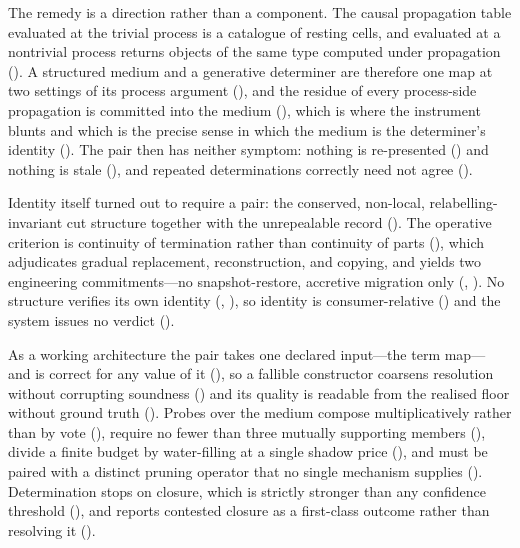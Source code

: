 \documentclass[11pt,twocolumn,a4paper]{article}
\theoremstyle{dirthm}
\theoremstyle{definition}
\theoremstyle{remark}
\begin{document}
The remedy is a direction rather than a component. The causal propagation table
evaluated at the trivial process is a catalogue of resting cells, and evaluated
at a nontrivial process returns objects of the same type computed under
propagation (). A structured medium and a generative
determiner are therefore one map at two settings of its process argument
(), and the residue of every process-side propagation is
committed into the medium (), which is where the
instrument blunts and which is the precise sense in which the medium is the
determiner's identity (). The pair then has neither
symptom: nothing is re-presented () and nothing is
stale (), and repeated determinations correctly need not
agree ().

Identity itself turned out to require a pair: the conserved, non-local,
relabelling-invariant cut structure together with the unrepealable record
(). The operative criterion is continuity of termination
rather than continuity of parts (), which
adjudicates gradual replacement, reconstruction, and copying, and yields two
engineering commitments---no snapshot-restore, accretive migration only
(, ). No structure verifies its own
identity (, ), so identity is
consumer-relative () and the system issues no verdict
().

As a working architecture the pair takes one declared input---the term map---%
and is correct for any value of it (), so a fallible
constructor coarsens resolution without corrupting soundness
() and its quality is readable from the realised floor
without ground truth (). Probes over the medium
compose multiplicatively rather than by vote (),
require no fewer than three mutually supporting members
(), divide a finite budget by water-filling at a single
shadow price (), and must be paired with a distinct pruning
operator that no single mechanism supplies
(). Determination stops on closure, which is
strictly stronger than any confidence threshold
(), and reports contested closure as a first-class
outcome rather than resolving it ().
\end{document}
